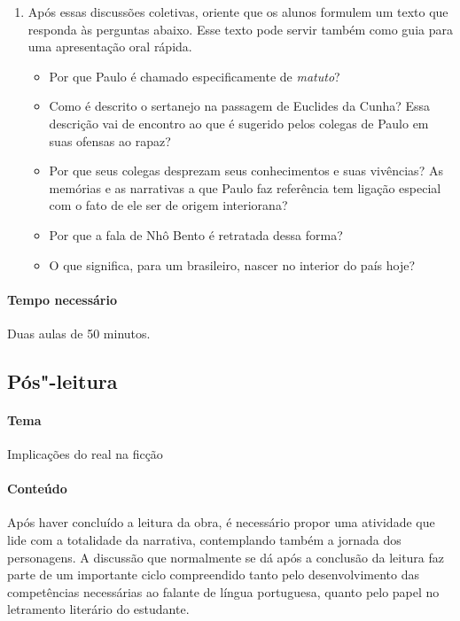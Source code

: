 \documentclass[12pt]{extarticle}
\begin{document}
\begin{enumerate}
\item Após essas discussões coletivas, oriente que os alunos formulem um
texto que responda às perguntas abaixo. Esse texto pode servir
também como guia para uma apresentação oral rápida.

\begin{itemize}
\item
  Por que Paulo é chamado especificamente de \emph{matuto}?
\item
  Como é descrito o sertanejo na passagem de Euclides da Cunha? Essa
  descrição vai de encontro ao que é sugerido pelos colegas de Paulo em
  suas ofensas ao rapaz?
\item
  Por que seus colegas desprezam seus conhecimentos e suas vivências? As
  memórias e as narrativas a que Paulo faz referência tem ligação
  especial com o fato de ele ser de origem interiorana?
\item
  Por que a fala de Nhô Bento é retratada dessa forma?
\item
  O que significa, para um brasileiro, nascer no interior do país hoje?
\end{itemize}
\end{enumerate}

\paragraph{Tempo necessário} Duas aulas de 50 minutos.

\subsection{Pós"-leitura}

\paragraph{Tema} Implicações do real na ficção


\paragraph{Conteúdo}
Após haver concluído a leitura da obra, é necessário propor uma
atividade que lide com a totalidade da narrativa, contemplando também
a jornada dos personagens. A discussão que normalmente se dá após a
conclusão da leitura faz parte de um importante ciclo compreendido
tanto pelo desenvolvimento das competências necessárias ao falante de
língua portuguesa, quanto pelo papel no letramento literário do
estudante.
\end{document}
